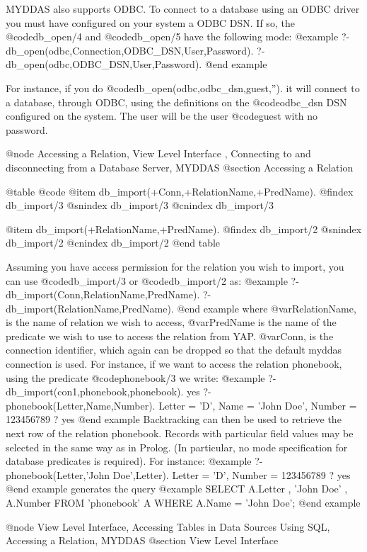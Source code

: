 {{{{{{{{MYDDAS also supports ODBC. To connect to a database using an ODBC driver
you must have configured on your system a ODBC DSN. If so, the @code{db_open/4}
and @code{db_open/5} have the following mode:
@example
 ?- db_open(odbc,Connection,ODBC_DSN,User,Password). 
 ?- db_open(odbc,ODBC_DSN,User,Password).
@end example

For instance, if you do @code{db_open(odbc,odbc_dsn,guest,'')}. it will connect
to a database, through ODBC, using the definitions on the @code{odbc_dsn} DSN
configured on the system. The user will be the user @code{guest} with no
password.

@node Accessing a Relation, View Level Interface , Connecting to and disconnecting from a Database Server, MYDDAS 
@section Accessing a Relation

@table @code
@item db_import(+Conn,+RelationName,+PredName). 
@findex db_import/3
@snindex db_import/3
@cnindex db_import/3

@item db_import(+RelationName,+PredName).  
@findex db_import/2
@snindex db_import/2
@cnindex db_import/2
@end table

Assuming you have access permission for the relation you wish to import,
you can use @code{db_import/3} or @code{db_import/2} as:
@example
?- db_import(Conn,RelationName,PredName).
?- db_import(RelationName,PredName).
@end example
 where @var{RelationName}, is the name of
relation we wish to access, @var{PredName} is the name of the predicate we
wish to use to access the relation from YAP. @var{Conn}, is the connection
identifier, which again can be dropped so that the default myddas connection
is used. For instance, if we want to access the relation phonebook,
using the predicate @code{phonebook/3} we write: 
@example
?- db_import(con1,phonebook,phonebook). 
yes
?- phonebook(Letter,Name,Number).
Letter = 'D',
Name = 'John Doe',
Number = 123456789 ? 
yes
@end example
Backtracking can then be used to retrieve the next row
of the relation phonebook.  Records with particular field values may be
selected in the same way as in Prolog. (In particular, no mode
specification for database predicates is required). For instance: 
@example
?- phonebook(Letter,'John Doe',Letter). 
Letter = 'D', 
Number = 123456789 ?
yes
@end example
generates the query @example
SELECT A.Letter , 'John Doe' , A.Number 
FROM 'phonebook' A 
WHERE A.Name = 'John Doe';
@end example

@node View Level Interface, Accessing Tables in Data Sources Using SQL, Accessing a Relation, MYDDAS
@section View Level Interface

}}}}}}}}
